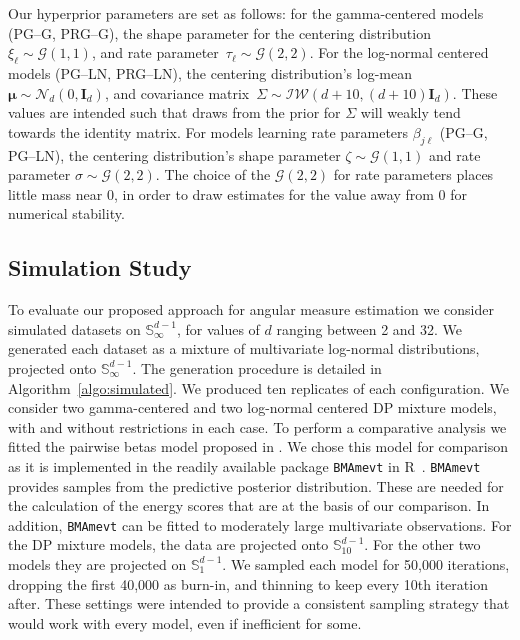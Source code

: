 Our hyperprior parameters are set as follows: for the gamma-centered models (PG--G, PRG--G), 
    the shape parameter for the centering 
    distribution~$\xi_{\ell}\sim \mathcal{G}\left(1,1\right)$, and
    rate parameter~$\tau_{\ell}\sim\mathcal{G}\left(2,2\right)$.
    For the log-normal centered models (PG--LN, PRG--LN), the centering distribution's
    log-mean $\bm{\mu}\sim\mathcal{N}_d\left(0,\bm{I}_d\right)$, and covariance 
    matrix~$\Sigma\sim\mathcal{IW}\left(d + 10, (d+10)\bm{I}_{d}\right)$.  These values are 
    intended such that draws from the prior for $\Sigma$ will weakly tend towards the 
    identity matrix.
    For models learning rate parameters $\beta_{j\ell}$ (PG--G, PG--LN), the centering
    distribution's shape parameter $\zeta\sim\mathcal{G}\left(1,1\right)$ and rate parameter
    $\sigma\sim\mathcal{G}\left(2,2\right)$.  The choice of the $\mathcal{G}(2,2)$ for rate
    parameters places little mass near 0, in order to draw estimates for the value away from 
    0 for numerical stability.

\subsection{Simulation Study\label{subsec:simulated}}
To evaluate our proposed approach for angular measure estimation 
    we consider simulated datasets on $\mathbb{S}_{\infty}^{d-1}$,
    for values of $d$ ranging between 2 and 32.  We generated each
    dataset as a mixture of multivariate log-normal distributions,
    projected onto $\mathbb{S}_{\infty}^{d-1}$. The generation 
    procedure is detailed in Algorithm~\ref{algo:simulated}. We produced 
    ten replicates of each configuration. We consider two gamma-centered
    and two log-normal centered DP mixture models, with and without restrictions in each
    case. To perform a comparative analysis we fitted 
    the pairwise betas model proposed in \cite{COOLEY2010}. We chose this model for comparison
    as it is implemented in the readily available package \verb|BMAmevt| 
    in R~\citep{BMAmevt}. \verb|BMAmevt| provides samples from the predictive
    posterior distribution. These are needed for the calculation of the energy
    scores that are at the basis of our comparison. In addition, \verb|BMAmevt| can 
    be fitted to moderately large multivariate observations. For the DP mixture
    models, the data are projected onto $\mathbb{S}_{10}^{d-1}$. For the other
    two models they are projected on $\mathbb{S}_1^{d-1}$.   We sampled each model for 50,000 
    iterations, dropping the first 40,000 as burn-in, and thinning to keep every 10th iteration
    after.  These settings were intended to provide a consistent sampling strategy that would
    work with every model, even if inefficient for some.

